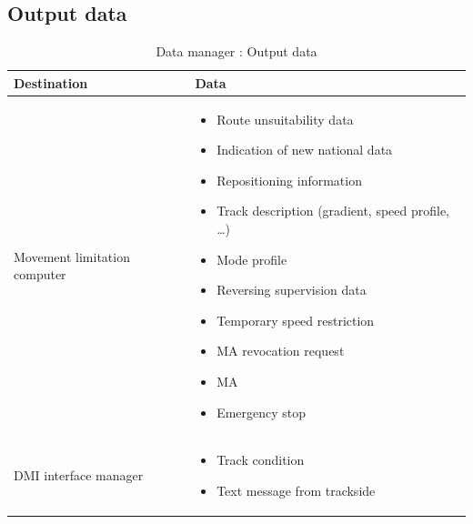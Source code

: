 \documentclass[nocc]{template/openetcs_report}
\begin{document}
\subsection{Output data}
			\begin{longtable}{|l|l|}
				\caption{Data manager : Output data}\\ 
				\hline
				
					\begin{minipage}[t]{0.35\linewidth} \textbf{Destination}	\end{minipage} 
				&	\begin{minipage}[t]{0.65\linewidth} \textbf{Data} \end{minipage} \\
				
				\hline
																																									
					\begin{minipage}[t]{0.35\linewidth} Movement limitation computer	\end{minipage} 
				&	\begin{minipage}[t]{0.65\linewidth}
						\begin{itemize}
							\item Route unsuitability data
							\item Indication of new national data
							\item Repositioning information
							\item Track description (gradient, speed profile, …)
							\item Mode profile
							\item Reversing supervision data
							\item Temporary speed restriction
							\item MA revocation request
							\item MA
							\item Emergency stop						
						\end{itemize}
					\end{minipage} \\
				
				\hline
				
					\begin{minipage}[t]{0.35\linewidth} DMI interface manager	\end{minipage} 
				&	\begin{minipage}[t]{0.65\linewidth}
						\begin{itemize}
							\item Track condition
							\item Text message from trackside
						\end{itemize}			
					\end{minipage} \\
				

\end{longtable}
\end{document}
